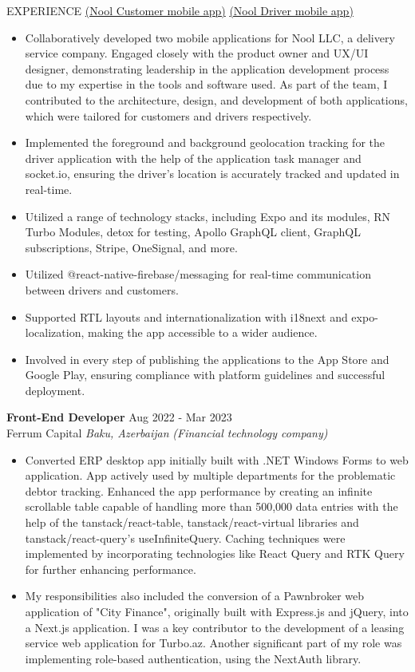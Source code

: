 \documentclass{resume} %
\begin{document}
\begin{rSection}{EXPERIENCE}
\href{https://apps.apple.com/us/app/nool/id6478508548}{(Nool Customer mobile app)}
\href{https://apps.apple.com/us/app/nool-driver/id6478509151}{(Nool Driver mobile app)}
 \begin{itemize}
    \itemsep -3pt {} 
        \item Collaboratively developed two mobile applications for Nool LLC, a delivery service company. Engaged closely with the product owner and UX/UI designer, demonstrating leadership in the application development process due to my expertise in the tools and software used. As part of the team, I contributed to the architecture, design, and development of both applications, which were tailored for customers and drivers respectively.
        \item Implemented the foreground and background geolocation tracking for the driver application with the help of the application task manager and socket.io, ensuring the driver's location is accurately tracked and updated in real-time.
        \item Utilized a range of technology stacks, including Expo and its modules, RN Turbo Modules, detox for testing, Apollo GraphQL client, GraphQL subscriptions, Stripe, OneSignal, and more.
        \item Utilized @react-native-firebase/messaging for real-time communication between drivers and customers.
        \item Supported RTL layouts and internationalization with i18next and expo-localization, making the app accessible to a wider audience. 
        \item Involved in every step of publishing the applications to the App Store and Google Play, ensuring compliance with platform guidelines and successful deployment.
 \end{itemize}

\textbf{Front-End Developer} \hfill Aug 2022 - Mar 2023\\
Ferrum Capital \hfill \textit{Baku, Azerbaijan}
\textit{(Financial technology company)}
 \begin{itemize}
    \itemsep -3pt {}
    \item 
    Converted ERP desktop app initially built with .NET Windows Forms to web application. App actively used by multiple departments for the problematic debtor tracking. Enhanced the app performance by creating an infinite scrollable table capable of handling more than 500,000 data entries with the help of the tanstack/react-table, tanstack/react-virtual libraries and tanstack/react-query's useInfiniteQuery. Caching techniques were implemented by incorporating technologies like React Query and RTK Query for further enhancing performance.
    \item 
    My responsibilities also included the conversion of a Pawnbroker web application of "City Finance", originally built with Express.js and jQuery, into a Next.js application. I was a key contributor to the development of a leasing service web application for Turbo.az. Another significant part of my role was implementing role-based authentication, using the NextAuth library.
 \end{itemize}
\end{rSection} 
\end{document}
